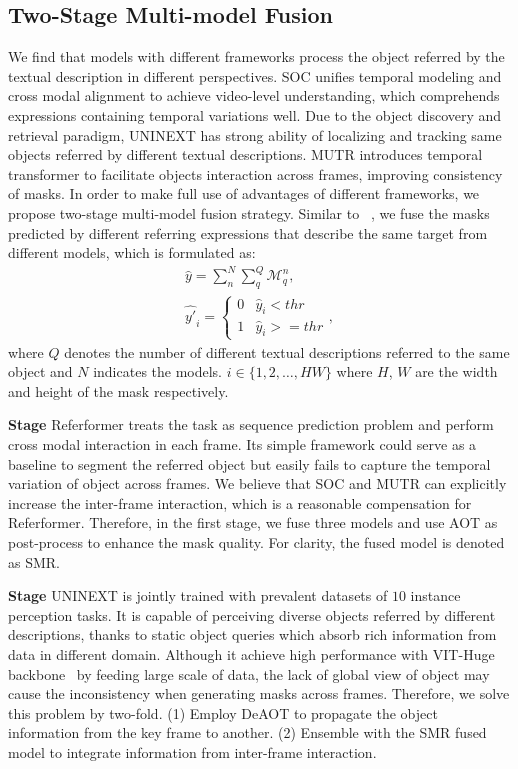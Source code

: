 \documentclass[10pt,twocolumn,letterpaper]{article}
\begin{document}
\subsection{Two-Stage Multi-model Fusion}
\label{sec:ensemble}
We find that models with different frameworks process the object referred by the textual description in different perspectives. SOC unifies temporal modeling and cross modal alignment to achieve video-level understanding, which comprehends expressions containing temporal variations well. Due to the object discovery and retrieval paradigm, UNINEXT has strong ability of localizing and tracking same objects referred by different textual descriptions. MUTR introduces temporal transformer to facilitate objects interaction across frames, improving consistency of masks. In order to make full use of advantages of different frameworks, we propose two-stage multi-model fusion strategy. Similar to ~\cite{last_champ}, we fuse the masks predicted by different referring expressions that describe the same target from different models, which is formulated as:
\begin{equation}
    \begin{gathered}
        \hat{y} = \sum_{n}^{N}\sum^{Q}_{q}\mathcal{M}^n_q, \\    
        \hat{y'}_i = \begin{cases}0 & \hat{y}_i<thr \\ 1 & \hat{y}_i>=thr\end{cases},
    \end{gathered}
\end{equation}
where $Q$ denotes the number of different textual descriptions referred to the same object and $N$ indicates the models. $i \in \{1,2, \dots, HW\}$ where $H$, $W$ are the width and height of the mask respectively.  

\textbf{Stage \uppercase\expandafter{}} Referformer treats the task as sequence prediction problem and perform cross modal interaction in each frame. 
Its simple framework could serve as a baseline to segment the referred object but easily fails to capture the temporal variation of object across frames. 
We believe that SOC and MUTR can explicitly increase the inter-frame interaction, which is a reasonable compensation for Referformer. 
Therefore, in the first stage, we fuse three models and use AOT as post-process to enhance the mask quality. For clarity, the fused model is denoted as SMR.

\textbf{Stage \uppercase\expandafter{}} UNINEXT is jointly trained with prevalent datasets of $10$ instance perception tasks. 
It is capable of perceiving diverse objects referred by different descriptions, thanks to static object queries which absorb rich information from data in different domain. 
Although it achieve high performance with VIT-Huge backbone~\cite{vith} by feeding large scale of data, the lack of global view of object may cause the inconsistency when generating masks across frames. 
Therefore, we solve this problem by two-fold. (1) Employ DeAOT to propagate the object information from the key frame to another. (2) Ensemble with the SMR fused model to integrate information from inter-frame interaction. 
\end{document}
